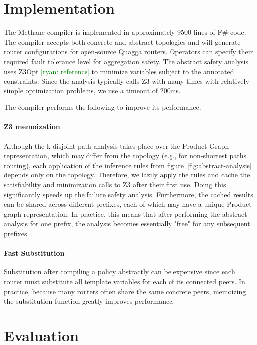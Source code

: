 \documentclass{sig-alternate-10pt}
\newcommand{\ryan}[1]{\textcolor{green}{[ryan: #1]}}
\newcommand{\sysname}{{\small \sf Methane}\xspace}
\newcommand{\para}[1]{\paragraph*{\textbf{#1}}}
\begin{document}
%
%
%
%


\section{Implementation}
\label{sec:implementation}

The \sysname compiler is implemented in approximately 9500 lines of F\# code. The compiler accepts both concrete and abstract topologies and will generate router configurations for open-source Quagga routers. Operators can specify their required fault tolerance level for aggregation safety. The abstract safety analysis uses Z3Opt \ryan{reference} to minimize variables subject to the annotated constraints. Since the analysis typically calls Z3 with many times with relatively simple optimization problems, we use a timeout of 200ms. 

The compiler performs the following to improve its performance.

\para{Z3 memoization}

Although the k-disjoint path analysis takes place over the Product Graph representation, which may differ from the topology (e.g., for non-shortest paths routing), each application of the inference rules from figure~\ref{fig:abstract-analysis} depends only on the topology. Therefore, we lazily apply the rules and cache the satisfiability and minimization calls to Z3 after their first use. Doing this significantly speeds up the failure safety analysis. Furthermore, the cached results can be shared across different prefixes, each of which may have a unique Product graph representation. In practice, this means that after performing the abstract analysis for one prefix, the analysis becomes essentially "free" for any subsequent prefixes.

\para{Fast Substitution}

Substitution after compiling a policy abstractly can be expensive since each router must substitute all template variables for each of its connected peers. In practice, because many routers often share the same concrete peers, memoizing the substitution function greatly improves performance.


%
%
%
%


\section{Evaluation}
\label{sec:evaluation}
\end{document}
